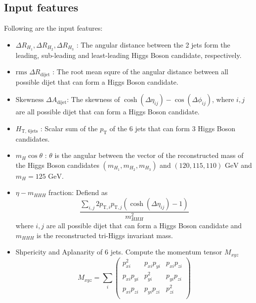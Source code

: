 \documentclass[12pt]{article}
\begin{document}
    \subsection{Input features}%
    \label{sub:input_features}
        Following are the input features:
        \begin{itemize}
            \item $\Delta R_{H_1}, \Delta R_{H_2}, \Delta R_{H_3}$ : The angular distance between the 2 jets form the leading, sub-leading and least-leading Higgs Boson candidate, respectively.
            \item $\text{rms } \Delta R_{\text{dijet}}$ : The root mean squre of the angular distance between all possible dijet that can form a Higgs Boson candidate.
            \item $\text{Skewness } \Delta A_{\text{dijet}}$: The skewness of $\cosh\left( \Delta\eta_{ij} \right) - \cos\left( \Delta\phi_{ij} \right) $, where $i,j$ are all possible dijet that can form a Higgs Boson candidate.
            \item $H_{\text{T, 6jets}}$ : Scalar sum of the $p_{\text{T}}$ of the 6 jets that can form 3 Higgs Boson candidates.
            \item $m_{H}\cos\theta$ : $\theta$ is the angular between the vector of the reconstructed mass of the Higgs Boson candidates $\left( m_{H_1}, m_{H_2}, m_{H_3} \right) $ and $\left( 120, 115, 110 \right) \text{ GeV}$ and $m_H = \text{125 GeV}$.
            \item $\eta - m_{HHH}$ fraction: Defiend as
            \begin{equation}
            \frac{\sum_{i,j} 2 p_{\text{T},i} p_{\text{T},j} \left( \cosh\left( \Delta\eta_{ij} \right) -1 \right) }{m_{HHH}^2}
            \end{equation}
            where $i,j$ are all possible dijet that can form a Higgs Boson candidate and $m_{HHH}$ is the reconstructed tri-Higgs invariant mass.
            \item Shpericity and Aplanarity of 6 jets. Compute the momentum tensor $M_{xyz}$ 
               \begin{equation}
                   M_{xyz} = \sum_{i}
                   \begin{pmatrix}
                       p_{xi}^2 & p_{xi}p_{yi} & p_{xi}p_{zi} \\
                       p_{xi}p_{yi} & p_{yi}^2 & p_{yi}p_{zi} \\
                       p_{xi}p_{zi} & p_{yi}p_{zi} & p_{zi}^2 \\

\end{pmatrix}
\end{equation}
\end{itemize}
\end{document}

